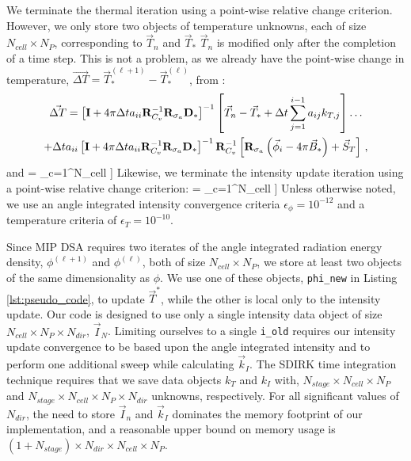 We terminate the thermal iteration using a point-wise relative change criterion. 
However, we only store two objects of temperature unknowns, each of size $N_{cell} \times N_P$, corresponding to $\vec{T}_n$ and $\vec{T}_*$
$\vec{T}_n$ is modified only after the completion of a time step.  
This is not a problem, as we already have the point-wise change in temperature, $\vec{\Delta T} = \vec{T}_*^{(\ell+1)} - \vec{T}_*^{(\ell)}$, from :
\begin{multline}
\vec{\Delta T} = \left[ \mathbf{I} + 4\pi\Delta t a_{ii}\mathbf{R}_{C_v}^{-1}\mathbf{R}_{\sigma_a} \mathbf{D}_*   \right]^{-1}\left[\vec{T}_n -\vec{T}_* + \Delta t \sum_{j=1}^{i-1}{a_{ij} k_{T,j}   }\right] \dots \\
+ \Delta t a_{ii}\left[ \mathbf{I}  + 4\pi\Delta t a_{ii}\mathbf{R}_{C_v}^{-1}\mathbf{R}_{\sigma_a} \mathbf{D}_*   \right]^{-1}\mathbf{R}_{C_v}^{-1}
\left[ \mathbf{R}_{\sigma_a}\left(\vec{\phi}_i - 4\pi\vec{B}_*  \right) + \vec{S}_T \right] \, ,
\end{multline}
and
\benum
{} = \max_{c=1}^{N_{cell}} \left[ \max_{j=1}^{N_P} \left[  \abs{ \frac{ \Delta T_j }{ T_{j,*} } } \right] \right] \pep
\eenum
Likewise, we terminate the intensity update iteration using a point-wise relative change criterion:
\benum
{} = \max_{c=1}^{N_{cell}} \left[ \max_{j=1}^{N_P} \left[ { \abs{ \frac{ \phi^{(\ell+1)}_{c,j} - \phi^{(\ell)}_{c,j}}{\phi^{(\ell+1)}_{c,j} }} } \right] \right] \pep
\eenum
Unless otherwise noted, we use an angle integrated intensity convergence criteria $\epsilon_{\phi} = 10^{-12}$ and a temperature criteria of $\epsilon_{T} = 10^{-10}$.

Since MIP DSA requires two iterates of the angle integrated radiation energy density, $\phi^{(\ell+1)}$ and $\phi^{(\ell)}$, both of size $N_{cell} \times N_P$, we store at least two objects of the same dimensionality as $\phi$.
We use one of these objects, \verb+phi_new+ in Listing \ref{lst:pseudo_code}, to update $\vec{T}^*$, while the other is local only to the intensity update.
Our code is designed to use only a single intensity data object of size $N_{cell} \times N_P \times N_{dir}$, $\vec{I}_N$.
Limiting ourselves to a single \verb+i_old+ requires our intensity update convergence to be based upon the angle integrated intensity and to perform one additional sweep while calculating $\vec{k}_I$.
The SDIRK time integration technique requires that we save data objects $k_T$ and $k_I$ with,  $N_{stage} \times N_{cell} \times N_P$ and $N_{stage} \times N_{cell} \times N_P \times N_{dir}$ unknowns, respectively.
For all significant values of $N_{dir}$, the need to store $\vec{I}_n$ and $\vec{k}_I$ dominates the memory footprint of our implementation, and a reasonable upper bound on memory usage is $(1+N_{stage}) \times N_{dir} \times N_{cell} \times N_P$.

